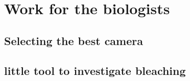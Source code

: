 \chapter{Work for the biologists}
\section{Selecting the best camera}


\section{little tool to investigate bleaching}
